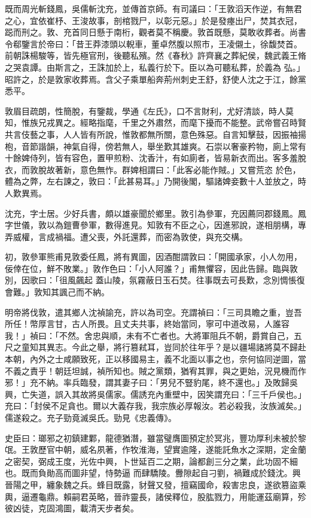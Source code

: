 \begin{pinyinscope}
 既而周光斬錢鳳，吳儒斬沈充，並傳首京師。有司議曰：「王敦滔天作逆，有無君之心，宜依崔杼、王浚故事，剖棺戮尸，以彰元惡。」於是發瘞出尸，焚其衣冠，跽而刑之。敦、充首同日懸于南桁，觀者莫不稱慶。敦首既懸，莫敢收葬者。尚書令郗鑒言於帝曰：「昔王莽漆頭以輗車，董卓然腹以照市，王凌儭土，徐馥焚首。前朝誅楊駿等，皆先極官刑，後聽私殯。然《春秋》許齊襄之葬紀侯，魏武義王脩之哭袁譚。由斯言之，王誅加於上，私義行於下。臣以為可聽私葬，於義為
 弘。」昭許之，於是敦家收葬焉。含父子乘單船奔荊州刺史王舒，舒使人沈之于江，餘黨悉平。



 敦眉目疏朗，性簡脫，有鑒裁，學通《左氏》，口不言財利，尤好清談，時人莫知，惟族兄戎異之。經略指麾，千里之外肅然，而麾下擾而不能整。武帝嘗召時賢共言伎藝之事，人人皆有所說，惟敦都無所關，意色殊惡。自言知擊鼓，因振袖揚枹，音節諧韻，神氣自得，傍若無人，舉坐歎其雄爽。石崇以奢豪矜物，廁上常有十餘婢侍列，皆有容色，置甲煎粉、沈香汁，有如廁者，皆易新衣而出。客多羞脫衣，而敦脫故著新，意色無怍。群婢相謂曰：「此客必能作賊。」又嘗荒恣
 於色，體為之弊，左右諫之，敦曰：「此甚易耳。」乃開後閣，驅諸婢妾數十人並放之，時人歎異焉。



 沈充，字士居。少好兵書，頗以雄豪聞於鄉里。敦引為參軍，充因薦同郡錢鳳。鳳字世儀，敦以為鎧曹參軍，數得進見。知敦有不臣之心，因進邪說，遂相朋構，專弄威權，言成禍福。遭父喪，外託還葬，而密為敦使，與充交構。



 初，敦參軍熊甫見敦委任鳳，將有異圖，因酒酣謂敦曰：「開國承家，小人勿用，佞倖在位，鮮不敗業。」敦作色曰：「小人阿誰？」甫無懼容，因此告歸。臨與敦別，因歌曰：「徂風飆起
 蓋山陵，氛霧蔽日玉石焚。往事既去可長歎，念別惆悵復會難。」敦知其諷己而不納。



 明帝將伐敦，遣其鄉人沈禎諭充，許以為司空。充謂禎曰：「三司具瞻之重，豈吾所任！幣厚言甘，古人所畏。且丈夫共事，終始當同，寧可中道改易，人誰容我！」禎曰：「不然。舍忠與順，未有不亡者也。大將軍阻兵不朝，爵賞自己，五尺之童知其異志。今此之舉，將行篡弒耳，豈同於往年乎？是以疆場諸將莫不歸赴本朝，內外之士咸願致死，正以移國易主，義不北面以事之也，奈何協同逆圖，當不義之責乎！朝廷坦誠，禎所知也。賊之黨類，猶宥其罪，與之更始，況見機而作
 邪！」充不納。率兵臨發，謂其妻子曰：「男兒不豎豹尾，終不還也。」及敗歸吳興，亡失道，誤入其故將吳儒家。儒誘充內重壁中，因笑謂充曰：「三千戶侯也。」充曰：「封侯不足貪也。爾以大義存我，我宗族必厚報汝。若必殺我，汝族滅矣。」儒遂殺之。充子勁竟滅吳氏。勁見《忠義傳》。



 史臣曰：瑯邪之初鎮建鄴，龍德猶潛，雖當璧膺圖預定於冥兆，豐功厚利未被於黎氓。王敦歷官中朝，威名夙著，作牧淮海，望實逾隆，遂能託魚水之深期，定金蘭之密契，弼成王度，光佐中興，卜世延百二之期，論都創三分之業，此功固不細也。既而負勛高而圖非望，恃勢逼
 而肆驕陵。釁隙起自刁劉，禍難成於錢沈。興晉陽之甲，纏象魏之兵。蜂目既露，豺聲又發，擅竊國命，殺害忠良，遂欲篡盜乘輿，逼遷龜鼎。賴嗣君英略，晉祚靈長，諸侯釋位，股肱戮力，用能運茲廟算，殄彼凶徒，克固鴻圖，載清天步者矣。




\end{pinyinscope}
